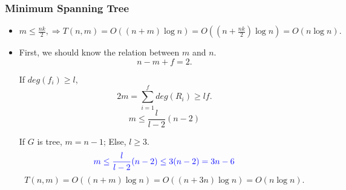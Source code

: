 \begin{frame}
  \frametitle{Minimum Spanning Tree}

  \begin{itemize}
      \item
        $m \le \frac{nk} {2}, \Rightarrow T(n,m) = O((n+m) \log n) = O((n+ \frac{nk}{2}) \log n) = O(n \log n).$

        \pause

      \item
        First, we should know the relation between $m$ and $n$.
        \begin{equation}
          n - m + f = 2. \label{eq: EulerExtension}
        \end{equation}

        If $deg(f_i) \ge l$,
        \begin{equation}
          2m = \sum_{i=1}^f deg(R_i) \ge lf. \label{eq: Handshaking}
        \end{equation}
        \begin{equation}
          m \le \frac{l}{l-2}(n-2)
        \end{equation}

        \pause

        If $G$ is tree, $m=n-1$; Else, $l \ge 3$.
        \begin{equation}
          \textcolor{blue}{m \le \frac{l}{l-2}(n-2) \le 3(n-2) = 3n - 6}
        \end{equation}
        \[
          T(n,m) = O((n+m) \log n) = O((n + 3n) \log n) = O(n \log n).
        \]
  \end{itemize}

\end{frame} 